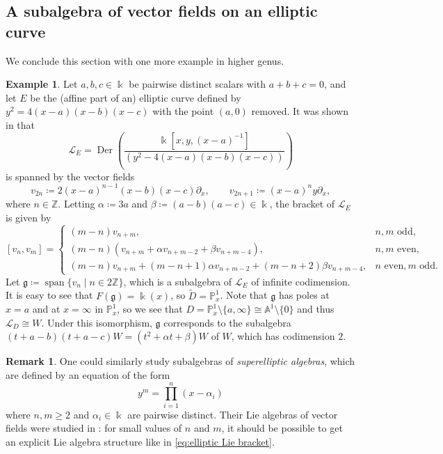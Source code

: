 \documentclass[12pt]{amsart}
\theoremstyle{plain}
\theoremstyle{definition}
\newtheorem{example}[theorem]{Example}
\newtheorem{remark}[theorem]{Remark}
\numberwithin{equation}{section}
\def\g{\mathfrak{g}}
\def\L{\mathcal{L}}
\def\ZZ{\mathbb{Z}}
\def\Aa{\mathbb{A}}
\def\PP{\mathbb{P}}
\def\kk{\Bbbk}
\DeclareMathOperator{\Der}{Der}
\DeclareMathOperator{\spn}{span}
\def\del{\partial}
\begin{document}
\subsection{A subalgebra of vector fields on an elliptic curve}

We conclude this section with one more example in higher genus.

\begin{example}\label{ex:elliptic}
    Let $a, b, c \in \kk$ be pairwise distinct scalars with $a + b + c = 0$, and let $E$ be the (affine part of an) elliptic curve defined by $y^2 = 4(x - a)(x - b)(x - c)$ with the point $(a,0)$ removed. It was shown in \cite[Propositions 3 and 4]{SchlichenmaierDegenerations} that
    $$\L_E = \Der\left(\frac{\kk[x, y, (x - a)^{-1}]}{(y^2 - 4(x - a)(x - b)(x - c))}\right)$$
    is spanned by the vector fields
    $$v_{2n} \coloneqq 2(x - a)^{n - 1}(x - b)(x - c)\del_x, \qquad v_{2n + 1} \coloneqq (x - a)^n y \del_x,$$
    where $n \in \ZZ$. Letting $\alpha \coloneqq 3a$ and $\beta \coloneqq (a - b)(a - c) \in \kk$, the bracket of $\L_E$ is given by
    \begin{equation}\label{eq:elliptic Lie bracket}
        [v_n,v_m] = \begin{cases}
        (m - n)v_{n + m}, &n, m \text{ odd}, \\
        (m - n)(v_{n + m} + \alpha v_{n + m - 2} + \beta v_{n + m - 4}), &n, m \text{ even}, \\
        (m - n)v_{n + m} + (m - n + 1)\alpha v_{n + m - 2} + (m - n + 2)\beta v_{n + m - 4}, &n \text{ even}, m \text{ odd}.
    \end{cases}
    \end{equation}
    Let $\g \coloneqq \spn\{v_n \mid n \in 2\ZZ\}$, which is a subalgebra of $\L_E$ of infinite codimension. It is easy to see that $F(\g) = \kk(x)$, so $\widetilde{D} = \PP^1_x$. Note that $\g$ has poles at $x = a$ and at $x = \infty$ in $\PP^1_x$, so we see that $D = \PP^1_x \setminus \{a,\infty\} \cong \Aa^1 \setminus \{0\}$ and thus $\L_D \cong W$. Under this isomorphism, $\g$ corresponds to the subalgebra $(t + a - b)(t + a - c)W = (t^2 + \alpha t + \beta)W$ of $W$, which has codimension $2$.
\end{example}

\begin{remark}
    One could similarly study subalgebras of \emph{superelliptic algebras}, which are defined by an equation of the form
    $$y^m = \prod_{i = 1}^n (x - \alpha_i)$$
    where $n,m \geq 2$ and $\alpha_i \in \kk$ are pairwise distinct. Their Lie algebras of vector fields were studied in \cite{CoxGuoLuZhao}: for small values of $n$ and $m$, it should be possible to get an explicit Lie algebra structure like in \eqref{eq:elliptic Lie bracket}.
\end{remark}
\end{document}
